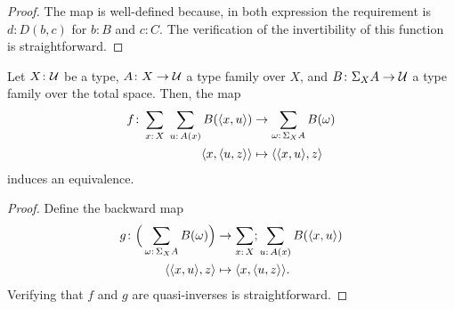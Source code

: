 \begin{proof}
    The map is well-defined because, in both expression the requirement is $d\colon D(b,c)$ for $b\colon B$ and $c\colon C$. The verification of the invertibility of this function is straightforward.

\end{proof}

\begin{prop}\label{prop:sigma-associativity} {}
    Let\/ $X\colon\univ$ be a type, $A\colon X\to\univ$ a type family over\/ $X$, and\/ $B\colon\Sigma_XA\to\univ$ a type family over the total space. Then, the map
    \begin{align*}
        f\colon\sum_{x\colon X\vphantom(}\;
        \sum_{u\colon A(x)}B(\dep{x,u})
        &\to
        \sum_{\omega\colon\Sigma_XA}B(\omega)\\
        \dep{x,\dep{u,z}}&\mapsto\dep{\dep{x,u},z}
    \end{align*}
    induces an equivalence.
\end{prop}

\begin{proof}
    Define the backward map
    \begin{align*}
        g\colon\Big(\sum_{\omega\colon\Sigma_XA}
            B(\omega)\Big)
        &\to
        \sum_{x\colon X\vphantom(};
        \sum_{u\colon A(x)}B(\dep{x,u})\\
        \dep{\dep{x,u},z}&\mapsto\dep{x,\dep{u,z}}.
    \end{align*}
    Verifying that $f$ and $g$ are quasi-inverses is straightforward.
\end{proof}

